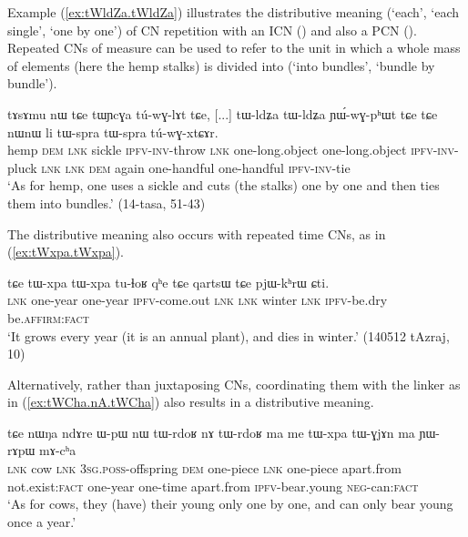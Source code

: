Example (\ref{ex:tWldZa.tWldZa}) illustrates the distributive meaning (`each', `each single', `one by one') of CN repetition with an ICN () and also a PCN  (). Repeated CNs of measure can be used to refer to the unit in which a whole mass of elements (here the hemp stalks) is divided into (`into bundles', `bundle by bundle').

\begin{exe}
\ex \label{ex:tWldZa.tWldZa}
 \gll  tɤsɤmu nɯ tɕe tɯɲcɣa tú-wɣ-lɤt tɕe, [...] tɯ-ldʑa tɯ-ldʑa ɲɯ́-wɣ-pʰɯt tɕe tɕe nɯnɯ li tɯ-spra tɯ-spra tú-wɣ-xtɕɤr. \\
hemp \textsc{dem} \textsc{lnk} sickle \textsc{ipfv}-\textsc{inv}-throw \textsc{lnk} { } one-long.object one-long.object \textsc{ipfv}-\textsc{inv}-pluck \textsc{lnk} \textsc{lnk} \textsc{dem} again one-handful one-handful \textsc{ipfv}-\textsc{inv}-tie  \\
 \glt `As for hemp, one uses a sickle and cuts (the stalks) one by one and then ties them into bundles.'  (14-tasa, 51-43)
\end{exe}

The distributive meaning also occurs with repeated time CNs, as in (\ref{ex:tWxpa.tWxpa}).

\begin{exe}
\ex \label{ex:tWxpa.tWxpa}
 \gll tɕe tɯ-xpa tɯ-xpa tu-ɬoʁ qʰe tɕe qartsɯ tɕe pjɯ-kʰrɯ ɕti. \\
 \textsc{lnk} one-year one-year \textsc{ipfv}-come.out \textsc{lnk} \textsc{lnk} winter \textsc{lnk}  \textsc{ipfv}-be.dry be.\textsc{affirm}:\textsc{fact} \\
 \glt  `It grows every year (it is an annual plant), and dies in winter.' (140512 tAzraj, 10)
\end{exe}

Alternatively, rather than juxtaposing CNs, coordinating them with the linker  as in (\ref{ex:tWCha.nA.tWCha}) also results in a distributive meaning.

\begin{exe}
\ex \label{ex:tWrdoʁ.nA.tWrdoʁ}
 \gll  tɕe nɯŋa ndɤre ɯ-pɯ nɯ tɯ-rdoʁ nɤ tɯ-rdoʁ ma me tɯ-xpa tɯ-ɣjɤn ma ɲɯ-rɤpɯ mɤ-cʰa \\
 \textsc{lnk} cow \textsc{lnk} \textsc{3sg}.\textsc{poss}-offspring \textsc{dem} one-piece \textsc{lnk} one-piece apart.from not.exist:\textsc{fact}  one-year one-time apart.from \textsc{ipfv}-bear.young \textsc{neg}-can:\textsc{fact} \\
 \glt `As for cows, they (have) their young only one by one, and can only bear young once a year.'
\end{exe}

